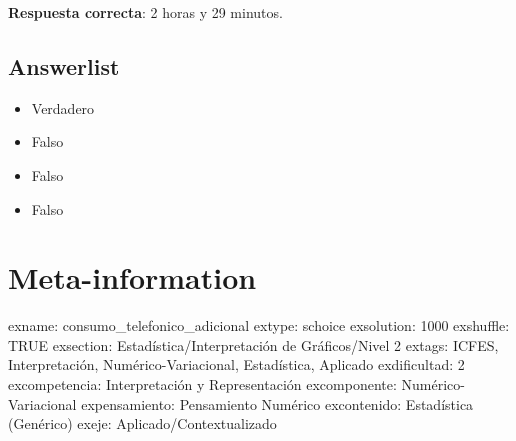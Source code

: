\documentclass[
]{article}
\providecommand{\tightlist}{%
  \setlength{\itemsep}{0pt}\setlength{\parskip}{0pt}}
\begin{document}
\textbf{Respuesta correcta}: 2 horas y 29 minutos.

\subsection{Answerlist}\label{answerlist-1}

\begin{itemize}
\tightlist
\item
  Verdadero
\item
  Falso
\item
  Falso
\item
  Falso
\end{itemize}

\section{Meta-information}\label{meta-information}

exname: consumo\_telefonico\_adicional extype: schoice exsolution: 1000
exshuffle: TRUE exsection: Estadística/Interpretación de Gráficos/Nivel
2 extags: ICFES, Interpretación, Numérico-Variacional, Estadística,
Aplicado exdificultad: 2 excompetencia: Interpretación y Representación
excomponente: Numérico-Variacional expensamiento: Pensamiento Numérico
excontenido: Estadística (Genérico) exeje: Aplicado/Contextualizado
\end{document}
